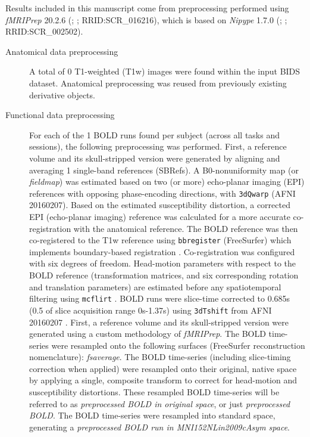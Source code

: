 \documentclass[]{article}
\date{}
\begin{document}
Results included in this manuscript come from preprocessing performed
using \emph{fMRIPrep} 20.2.6 (\citet{fmriprep1}; \citet{fmriprep2};
RRID:SCR\_016216), which is based on \emph{Nipype} 1.7.0
(\citet{nipype1}; \citet{nipype2}; RRID:SCR\_002502).

\begin{description}
\item[Anatomical data preprocessing]
A total of 0 T1-weighted (T1w) images were found within the input BIDS
dataset. Anatomical preprocessing was reused from previously existing
derivative objects.
\item[Functional data preprocessing]
For each of the 1 BOLD runs found per subject (across all tasks and
sessions), the following preprocessing was performed. First, a reference
volume and its skull-stripped version were generated by aligning and
averaging 1 single-band references (SBRefs). A B0-nonuniformity map (or
\emph{fieldmap}) was estimated based on two (or more) echo-planar
imaging (EPI) references with opposing phase-encoding directions, with
\texttt{3dQwarp} \citet{afni} (AFNI 20160207). Based on the estimated
susceptibility distortion, a corrected EPI (echo-planar imaging)
reference was calculated for a more accurate co-registration with the
anatomical reference. The BOLD reference was then co-registered to the
T1w reference using \texttt{bbregister} (FreeSurfer) which implements
boundary-based registration \citep{bbr}. Co-registration was configured
with six degrees of freedom. Head-motion parameters with respect to the
BOLD reference (transformation matrices, and six corresponding rotation
and translation parameters) are estimated before any spatiotemporal
filtering using \texttt{mcflirt} \citep[FSL 5.0.9,][]{mcflirt}. BOLD
runs were slice-time corrected to 0.685s (0.5 of slice acquisition range
0s-1.37s) using \texttt{3dTshift} from AFNI 20160207
\citep[RRID:SCR\_005927]{afni}. First, a reference volume and its
skull-stripped version were generated using a custom methodology of
\emph{fMRIPrep}. The BOLD time-series were resampled onto the following
surfaces (FreeSurfer reconstruction nomenclature): \emph{fsaverage}. The
BOLD time-series (including slice-timing correction when applied) were
resampled onto their original, native space by applying a single,
composite transform to correct for head-motion and susceptibility
distortions. These resampled BOLD time-series will be referred to as
\emph{preprocessed BOLD in original space}, or just \emph{preprocessed
BOLD}. The BOLD time-series were resampled into standard space,
generating a \emph{preprocessed BOLD run in MNI152NLin2009cAsym space}.

\end{description}
\end{document}
